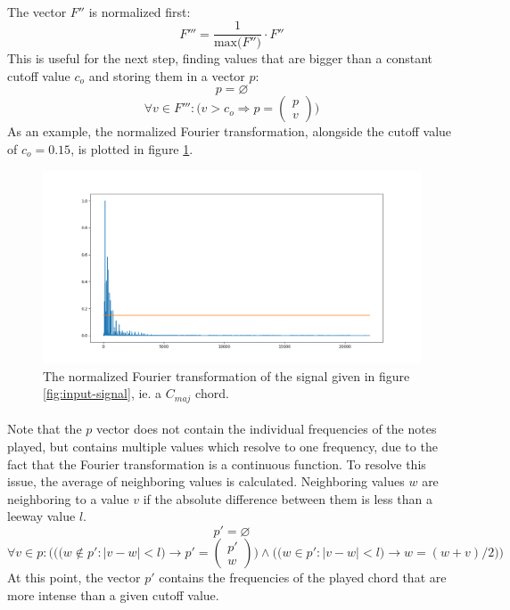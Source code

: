 \documentclass{article}
\providecommand{\abs}[1]{\lvert#1\rvert}
\begin{document}
\paragraph*{} 
The vector $F''$ is normalized first:
$$F''' = \frac{1}{\text{max(}F''\text{)}} \cdot F''$$
This is useful for the next step, finding values that are bigger than a 
constant cutoff value $c_o$ and storing them in a vector $p$:
$$p = \varnothing$$
$$\forall v \in F''' : \bigg(v > c_o \Rightarrow p = 
	\begin{pmatrix}
		p \\
		v
\end{pmatrix} \bigg)$$
As an example, the normalized Fourier transformation, alongside the cutoff 
value of $c_o = 0.15$, is plotted in figure \ref{fig:fourier-signal}.
\begin{figure}[ht]
	\centering
	\includegraphics[width=\textwidth]{img/fourier-signal}
	\caption{The normalized Fourier transformation of the signal given in 
	figure \ref{fig:input-signal}, ie. a $C_{maj}$ chord.}
	\label{fig:fourier-signal}
\end{figure}

\paragraph*{} 
Note that the $p$ vector does not contain the individual frequencies of the 
notes played, but contains multiple values which resolve to one frequency, due 
to the fact that the Fourier transformation is a continuous function. To 
resolve this issue, the average of neighboring values is calculated. 
Neighboring values $w$ are neighboring to a value $v$ if the absolute 
difference between them is less than a leeway value $l$.
$$p' = \varnothing$$
$$\forall v \in p : \Bigg( 
	\bigg(\big(w \not\in p' : \abs{v - w} < l \big) \rightarrow p' = 
		\begin{pmatrix}
			p' \\
			w
		\end{pmatrix}
	\bigg) \land
	\bigg(\big(w \in p' : \abs{v - w} < l \big) \rightarrow
		w = (w + v) / 2
	\bigg)
\Bigg)$$
At this point, the vector $p'$ contains the frequencies of the played chord 
that are more intense than a given cutoff value.
\end{document}
